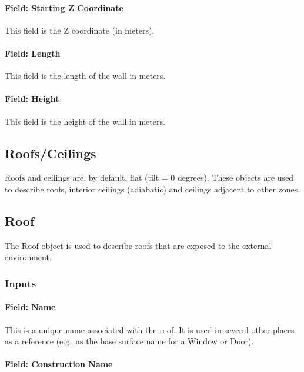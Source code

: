 \paragraph{Field: Starting Z Coordinate}\label{field-starting-z-coordinate-3}

This field is the Z coordinate (in meters).

\paragraph{Field: Length}\label{field-length-3}

This field is the length of the wall in meters.

\paragraph{Field: Height}\label{field-height-3}

This field is the height of the wall in meters.

\subsection{Roofs/Ceilings}\label{roofsceilings}

Roofs and ceilings are, by default, flat (tilt = 0 degrees). These objects are used to describe roofs, interior ceilings (adiabatic) and ceilings adjacent to other zones.

\subsection{Roof}\label{roof}

The Roof object is used to describe roofs that are exposed to the external environment.

\subsubsection{Inputs}\label{inputs-8-026}

\paragraph{Field: Name}\label{field-name-4-030}

This is a unique name associated with the roof. It is used in several other places as a reference (e.g.~as the base surface name for a Window or Door).

\paragraph{Field: Construction Name}\label{field-construction-name-4}

